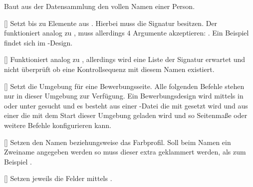 %
%
%

Baut aus der Datensammlung den vollen Namen einer Person.

%
%
%

[]
Setzt bis zu  Elemente aus . Hierbei muss  die Signatur  besitzen. Der  funktioniert analog zu , muss allerdings $4$ Argumente akzeptieren: . Ein Beispiel findet sich im -Design.

%
%
%

[]
Funktioniert analog zu , allerdings wird eine Liste der Signatur  erwartet und nicht überprüft ob eine Kontrollsequenz mit diesem Namen existiert.

%
%
%

[]
Setzt die Umgebung für eine Bewerbungsseite. Alle folgenden Befehle stehen nur in dieser Umgebung zur Verfügung. Ein Bewerbungsdesign wird mittels  in  oder unter  gesucht und es besteht aus einer -Datei die mit  gesetzt wird und aus einer  die mit dem Start dieser Umgebung geladen wird und so Seitenmaße oder weitere Befehle konfigurieren kann.

%
%
%

[\cmdlist{}]
Setzen den Namen beziehungsweise das Farbprofil. Soll beim Namen ein Zweiname angegeben werden so muss dieser extra geklammert werden, als zum Beispiel .

%
%
%

[\cmdlist{}\cmdlist{}\cmdlist\secline{}\cmdlist{}\cmdlist{}\cmdlist{}]
Setzen jeweils die Felder mittels .

